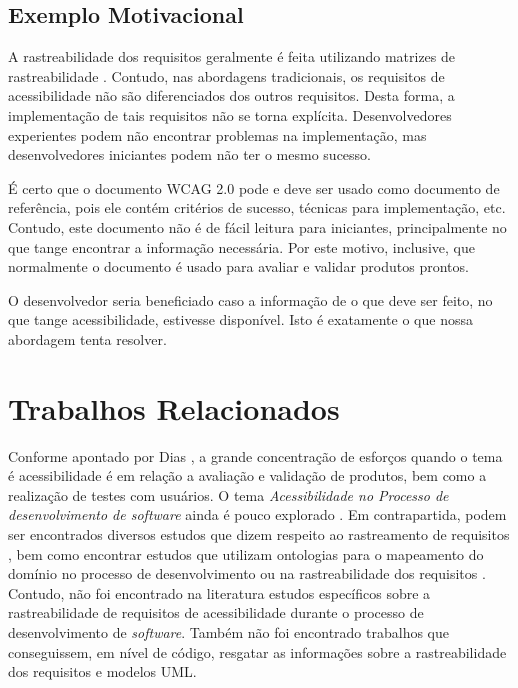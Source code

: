\documentclass[runningheads,a4paper]{llncs}
\begin{document}
\subsection{Exemplo Motivacional}

A rastreabilidade dos requisitos geralmente é feita utilizando matrizes de
rastreabilidade \cite{guo:2009:OBI:1681515.1682933}. Contudo, nas abordagens tradicionais, os
requisitos de acessibilidade não são diferenciados dos outros requisitos. Desta
forma, a implementação de tais requisitos não se torna explícita.
Desenvolvedores experientes podem não encontrar problemas na implementação, mas
desenvolvedores iniciantes podem não ter o mesmo sucesso.

É certo que o documento WCAG 2.0 pode e deve ser usado como documento de
referência, pois ele contém critérios de sucesso, técnicas para implementação,
etc. Contudo, este documento não é de fácil leitura para iniciantes,
principalmente no que tange encontrar a informação necessária. Por este motivo,
inclusive, que normalmente o documento é usado para avaliar e validar produtos
prontos.

O desenvolvedor seria beneficiado caso a informação de o que deve ser feito, no
que tange acessibilidade, estivesse disponível. Isto é exatamente o que nossa
abordagem tenta resolver.

\section{Trabalhos Relacionados}

Conforme apontado por Dias \cite{analuizadias:2010}, a grande concentração de esforços quando o tema é acessibilidade é em relação a avaliação e validação de produtos, bem como a realização de testes com usuários. O tema \textit{Acessibilidade no Processo de desenvolvimento de software} ainda
é pouco explorado \cite{maia:10}. Em contrapartida, podem ser encontrados diversos
estudos que dizem respeito ao rastreamento de requisitos
\cite{5970169,292398,5485417,6405269}, bem como encontrar estudos que utilizam
ontologias para o mapeamento do domínio no processo de desenvolvimento ou na
rastreabilidade dos requisitos \cite{5223183,6511842,4148940,5362244}. Contudo,
não foi encontrado na literatura estudos específicos sobre a rastreabilidade de
requisitos de acessibilidade durante o processo de desenvolvimento de \textit{software}. Também não foi encontrado trabalhos que conseguissem,
em nível de código, resgatar as informações sobre a rastreabilidade dos requisitos e modelos UML.
\end{document}
